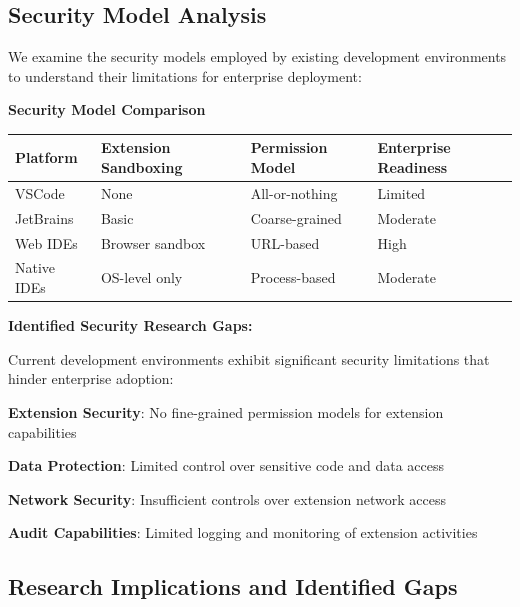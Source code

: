 \subsection{Security Model Analysis}
\label{subsec:security-analysis}

We examine the security models employed by existing development environments to understand their limitations for enterprise deployment:

\begin{successbox}
\textbf{Security Model Comparison}

\begin{center}
\begin{tabular}{@{}llll@{}}
\toprule
\textbf{Platform} & \textbf{Extension Sandboxing} & \textbf{Permission Model} & \textbf{Enterprise Readiness} \\
\midrule
VSCode & None & All-or-nothing & Limited \\
JetBrains & Basic & Coarse-grained & Moderate \\
Web IDEs & Browser sandbox & URL-based & High \\
Native IDEs & OS-level only & Process-based & Moderate \\
\bottomrule
\end{tabular}
\label{tab:security-analysis}
\end{center}
\end{successbox}

\textbf{Identified Security Research Gaps:}

Current development environments exhibit significant security limitations that hinder enterprise adoption:

\begin{compactlist}
    \item \textbf{Extension Security}: No fine-grained permission models for extension capabilities
    \item \textbf{Data Protection}: Limited control over sensitive code and data access
    \item \textbf{Network Security}: Insufficient controls over extension network access
    \item \textbf{Audit Capabilities}: Limited logging and monitoring of extension activities
\end{compactlist}

\subsection{Research Implications and Identified Gaps}
\label{subsec:research-implications}

